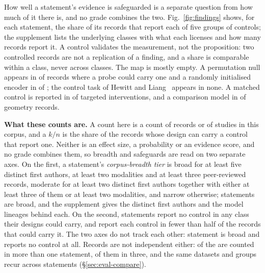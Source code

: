 How well a statement's evidence is safeguarded is a separate question from how much of it there is, and
no grade combines the two. Fig.~\ref{fig:findings} shows, for each statement, the share of its records
that report each of five groups of controls; the supplement lists the \Vnclasses{} underlying classes
with what each licenses and how many records report it. A control validates the measurement, not the proposition: two
controlled records are not a replication of a finding, and a share is comparable within a class, never
across classes. The map is mostly empty. A permutation null appears in \Vperm{} of \Vpermn{} records
where a probe could carry one and a randomly initialised encoder in \Vlrn{} of \Vlrnn{}; the control
task of Hewitt and Liang~\cite{hewitt2019designing} appears in none. A matched control is reported in
\Vspc{} of \Vspcn{} targeted interventions, and a comparison model in \Vcomp{} of \Vcompn{} geometry
records.

\textbf{What these counts are.} A count here is a count of records or of studies in this corpus, and a
$k/n$ is the share of the records whose design can carry a control that report one. Neither is an effect
size, a probability or an evidence score, and no grade combines them, so breadth and safeguards are read
on two separate axes. On the first, a statement's \emph{corpus-breadth tier} is broad for at least five
distinct first authors, at least two modalities and at least three peer-reviewed records, moderate for at
least two distinct first authors together with either at least three of them or at least two modalities,
and narrow otherwise; \Fbroad{} statements are broad, and the supplement gives the distinct first authors
and the model lineages behind each. On the second, \Fzeroclass{} statements report no control in any class
their designs could carry, and \Fhalfclass{} report each control in fewer than half of the records that
could carry it. The two axes do not track each other: \Fbroadzero{} statement is broad and reports no
control at all. Records are not independent either: \Fmultirow{} of the \Nclaims{} are counted in more than
one statement, \Fmultithree{} of them in three, and the same datasets and groups recur across statements
(\S\ref{sec:eval-compare}).

